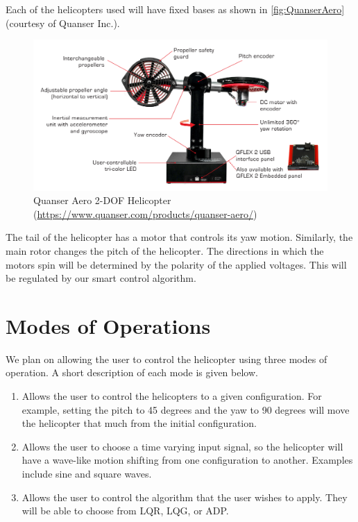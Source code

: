 \documentclass[12pt]{article} %
\begin{document}
Each of the helicopters used will have fixed bases as shown in \autoref{fig:QuanserAero} (courtesy of Quanser Inc.).  

\begin{figure}
  \centering
  \captionsetup{justification=centering,margin=3cm}
  \includegraphics{figs/img/QuanserAero}
  \caption{Quanser Aero 2-DOF Helicopter \newline (\url{https://www.quanser.com/products/quanser-aero/})}
  \label{fig:QuanserAero}
\end{figure}
%
The tail of the helicopter has a motor that controls its yaw motion.  Similarly, the main rotor changes the pitch of the helicopter.  The directions in which the motors spin will be determined by the polarity of the applied voltages.  This will be regulated by our smart control algorithm.


\section{Modes of Operations}
We plan on allowing the user to control the helicopter using three modes of operation.  A short description of each mode is given below.

\begin{enumerate}
    \item Allows the user to control the helicopters to a given configuration. For example, setting the pitch to 45 degrees and the yaw to 90 degrees will move the helicopter that much from the initial configuration.
    \item Allows the user to choose a time varying input signal, so the helicopter will have a wave-like motion shifting from one configuration to another.  Examples include sine and square waves.
    \item Allows the user to control the algorithm that the user wishes to apply.  They will be able to choose from LQR, LQG, or ADP.
\end{enumerate}
\end{document}
